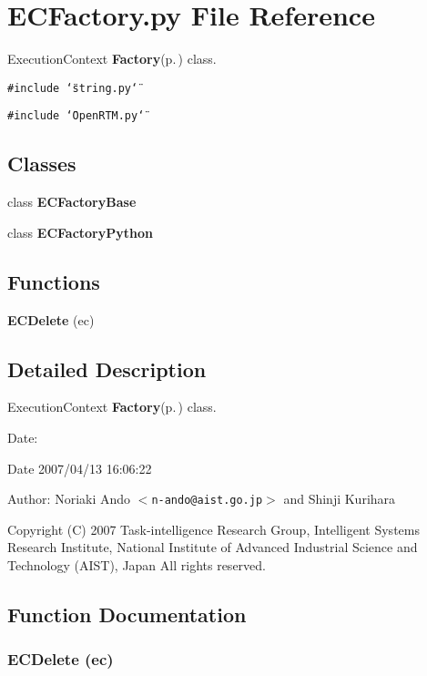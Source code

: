 \section{ECFactory.py File Reference}
\label{ECFactory_8py}
Execution\-Context {\bf Factory}{\rm (p.\,\pageref{namespaceFactory})} class. 

{\tt \#include \char`\"{}string.py\char`\"{}}\par
{\tt \#include \char`\"{}Open\-RTM.py\char`\"{}}\par
\subsection*{Classes}
\begin{CompactItemize}
\item 
class {\bf ECFactory\-Base}
\item 
class {\bf ECFactory\-Python}
\end{CompactItemize}
\subsection*{Functions}
\begin{CompactItemize}
\item 
{\bf ECDelete} (ec)
\end{CompactItemize}


\subsection{Detailed Description}
Execution\-Context {\bf Factory}{\rm (p.\,\pageref{namespaceFactory})} class. 

\begin{Desc}
\item[Date:]\begin{Desc}
\item[Date]2007/04/13 16:06:22 \end{Desc}
\end{Desc}
\begin{Desc}
\item[Author:]Noriaki Ando $<${\tt n-ando@aist.go.jp}$>$ and Shinji Kurihara\end{Desc}
Copyright (C) 2007 Task-intelligence Research Group, Intelligent Systems Research Institute, National Institute of Advanced Industrial Science and Technology (AIST), Japan All rights reserved.

\subsection{Function Documentation}
\subsubsection{\setlength{\rightskip}{0pt plus 5cm}ECDelete (ec)}\label{ECFactory_8py_a0}


